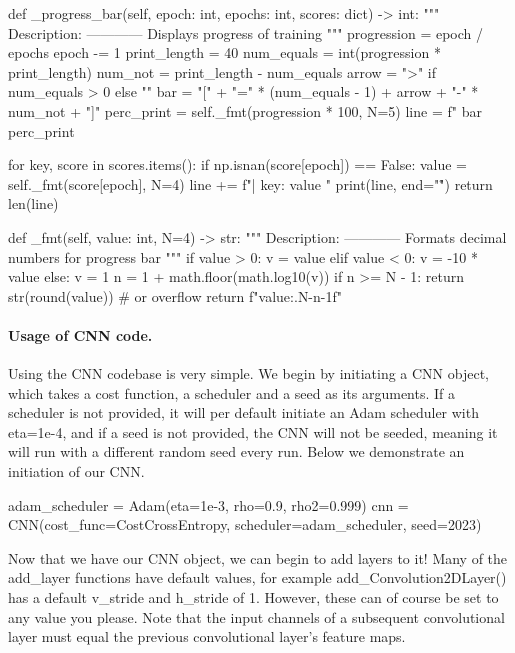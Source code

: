 \documentclass[%
oneside,                 %
final,                   %
10pt]{article}
\begin{document}
    def _progress_bar(self, epoch: int, epochs: int, scores: dict) -> int:
        """
        Description:
        ------------
            Displays progress of training
        """
        progression = epoch / epochs
        epoch -= 1
        print_length = 40
        num_equals = int(progression * print_length)
        num_not = print_length - num_equals
        arrow = ">" if num_equals > 0 else ""
        bar = "[" + "=" * (num_equals - 1) + arrow + "-" * num_not + "]"
        perc_print = self._fmt(progression * 100, N=5)
        line = f"  {bar} {perc_print}%

        for key, score in scores.items():
            if np.isnan(score[epoch]) == False:
                value = self._fmt(score[epoch], N=4)
                line += f"| {key}: {value} "
        print(line, end="\r")
        return len(line)

    def _fmt(self, value: int, N=4) -> str:
        """
        Description:
        ------------
            Formats decimal numbers for progress bar
        """
        if value > 0:
            v = value
        elif value < 0:
            v = -10 * value
        else:
            v = 1
        n = 1 + math.floor(math.log10(v))
        if n >= N - 1:
            return str(round(value))
            # or overflow
        return f"{value:.{N-n-1}f}"

\epycod


\paragraph{Usage of CNN code.}
Using the CNN codebase is very simple. We begin by initiating a CNN
object, which takes a cost function, a scheduler and a seed as its
arguments. If a scheduler is not provided, it will per default
initiate an Adam scheduler with eta=1e-4, and if a seed is not
provided, the CNN will not be seeded, meaning it will run with a
different random seed every run. Below we demonstrate an initiation of
our CNN.




\bpycod
adam_scheduler = Adam(eta=1e-3, rho=0.9, rho2=0.999)
cnn = CNN(cost_func=CostCrossEntropy, scheduler=adam_scheduler, seed=2023)

\epycod


Now that we have our CNN object, we can begin to add layers to it!
Many of the add_layer functions have default values, for example
add_Convolution2DLayer() has a default v_stride and h_stride of
1. However, these can of course be set to any value you please. Note
that the input channels of a subsequent convolutional layer must equal
the previous convolutional layer's feature maps.
\end{document}
